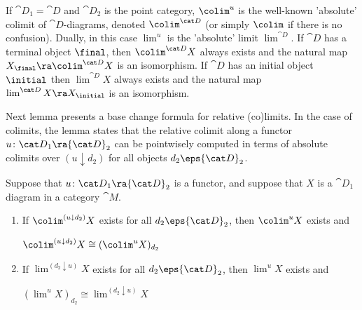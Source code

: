 If ${\cat D}_1 = {\cat D}$ and ${\cat D}_2$ is the point category, $\colim^u$ is the well-known 'absolute' colimit of ${\cat D}$-diagrams, denoted $\colim^{\cat D}$ (or simply $\colim$ if there is no confusion). Dually, in this case $\lim^u$ is the 'absolute' limit $\lim^{\cat D}$. If ${\cat D}$ has a terminal object $\final$, then $\colim^{\cat D} X$ always exists and the natural map $X_{\final} \ra \colim^{\cat D} X$ is an isomorphism. If ${\cat D}$ has an initial object $\initial$ then $\lim^{\cat D} X$ always exists and the natural map $\lim^{\cat D} X \ra X_{\initial}$ is an isomorphism.

Next lemma presents a base change formula for relative (co)limits. In the case of colimits, the lemma states that the relative colimit along a functor $u \colon {\cat D}_1 \ra {\cat D}_2$ can be pointwisely computed in terms of absolute colimits over $(u \downarrow d_2)$ for all objects $d_2 \eps {\cat D}_2$.

\begin{lem}
\label{lem::computerelcolim}
Suppose that $u \colon {\cat D}_1 \ra {\cat D}_2$ is a functor, and suppose that $X$ is a ${\cat D}_1$ diagram in a category ${\cat M}$.
\begin{enumerate}
\item
If $\colim^{(u \downarrow d_2)} X$ exists for all $d_2 \eps {\cat D}_2$, then $\colim^u X$ exists and 
\begin{center}
${\colim}^{(u \downarrow d_2)} X \cong ({\colim}^u X)_{d_2}$
\end{center}
\item
If $\lim^{(d_2 \downarrow u)} X$ exists for all $d_2 \eps {\cat D}_2$, then $\lim^u X$ exists and 
\begin{center}
$({\lim}^u X)_{d_2} \cong {\lim}^{(d_2 \downarrow u)} X$
\end{center}
\end{enumerate}
\end{lem}

